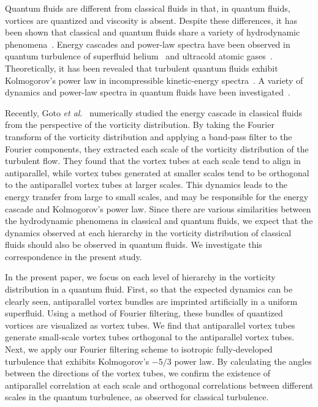 \documentclass[aps,onecolumn,pra,longbibliography]{revtex4}
\begin{document}
	Quantum fluids are different from classical fluids in that,
	in quantum fluids, vortices are quantized and viscosity is absent.
	Despite these differences, it has been shown that classical
	and quantum fluids share a variety of
	hydrodynamic phenomena~\cite{K.Sasaki1, M.T.Reeves1, W.J.Kwon, K.Sasaki2,
	T.Kadokura, H.Takeuchi, A.Bezett}.
	Energy cascades and power-law spectra have been observed
	in quantum turbulence of superfluid helium~\cite{L.Skrbek}
	and ultracold atomic gases~\cite{N.Navon}.
	Theoretically, it has been revealed that turbulent quantum fluids
	exhibit Kolmogorov's power law in incompressible kinetic-energy
	spectra~\cite{M.Tsubota1, M.Kobayashi1, M.Kobayashi2, M.Kobayashi3}.
	A variety of dynamics and power-law spectra in quantum fluids have been
	investigated~\cite{A.W.Baggaley, M.Tsubota2,
	K.Fujimoto, P.J.Tabeling, A.C.White, A.Villois, P.M.Walmsley, M.T.Reeves2,
	C.F.Barenghi1, C.F.Barenghi2, M.Kursa, R.M.Kerr1, S.R.Stalp, K.W.Madison,
	N.G.Parker, C.Nore}.


	Recently, Goto {\it et al}.~\cite{S.Goto1, S.Goto2}
	numerically studied the energy cascade in classical fluids
	from the perspective of the vorticity distribution.
	By taking the Fourier transform of the vorticity distribution and
	applying a band-pass filter to
	the Fourier components, they extracted each scale of the vorticity
	distribution of the turbulent flow. They found that the vortex tubes
	at each scale tend to align in antiparallel, while vortex tubes
	generated at smaller scales tend to be orthogonal to the antiparallel
	vortex tubes at larger scales. This dynamics leads to the energy
	transfer from large to small scales, and may be responsible for
	the energy cascade and Kolmogorov's power law.
	Since there are various similarities between
	the hydrodynamic phenomena in classical and quantum fluids, we expect that
	the dynamics observed at each hierarchy in the vorticity distribution
	of classical fluids should also be observed in quantum fluids.
	We investigate this correspondence in the present study.


	In the present paper, we focus on each level of hierarchy in the vorticity
	distribution in a quantum fluid.
	First, so that the expected dynamics can be clearly seen, antiparallel vortex bundles
	are imprinted artificially in a uniform superfluid.
	Using a method of Fourier filtering, these bundles of quantized vortices
	are visualized as vortex tubes. We find that
	antiparallel vortex tubes generate small-scale vortex tubes
	orthogonal to the antiparallel vortex tubes.
	Next, we apply our Fourier filtering scheme to isotropic fully-developed
	turbulence that exhibits Kolmogorov's $-5/3$ power law.
	By calculating the angles between the directions of the vortex tubes,
	we confirm the existence of antiparallel correlation at each scale
	and orthogonal correlations
	between different scales in the quantum turbulence,
	as observed for classical turbulence.
\end{document}
